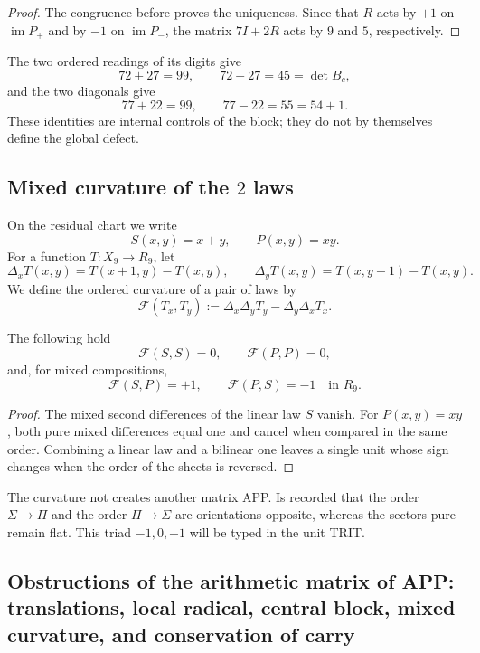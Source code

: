 \begin{proof}
The congruence before proves the uniqueness. Since that \(R\) acts by
\(+1\) on \(\operatorname{im}P_+\) and by \(-1\) on
\(\operatorname{im}P_-\), the matrix \(7I+2R\) acts by \(9\) and \(5\),
respectively.
\end{proof}

The two ordered readings of its digits give
\[
 72+27=99,
 \qquad
 72-27=45=\det B_c,
\]
and the two diagonals give
\[
 77+22=99,
 \qquad
 77-22=55=54+1.
\]
These identities are internal controls of the block; they do not by themselves define the global defect.

\subsection{Mixed curvature of the \(2\) laws}

On the residual chart we write
\[
 S(x,y)=x+y,
 \qquad
 P(x,y)=xy.
\]
For a function \(T:X_9\to R_9\), let
\[
 \Delta_xT(x,y)=T(x+1,y)-T(x,y),
 \qquad
 \Delta_yT(x,y)=T(x,y+1)-T(x,y).
\]
We define the ordered curvature of a pair of laws by
\[
 \mathcal F(T_x,T_y)
 :=\Delta_x\Delta_yT_y-\Delta_y\Delta_xT_x.
\]

\begin{proposition}
\label{p12-83-c1-s1:prop:app-curvatura-mixta}
The following hold
\[
 \mathcal F(S,S)=0,
 \qquad
 \mathcal F(P,P)=0,
\]
and, for mixed compositions,
\[
 \mathcal F(S,P)=+1,
 \qquad
 \mathcal F(P,S)=-1
 \quad\text{in }R_9.
\]
\end{proposition}

\begin{proof}
The mixed second differences of the linear law \(S\) vanish. For
\(P(x,y)=xy\), both pure mixed differences equal one and cancel when
compared in the same order. Combining a linear law and a bilinear one
leaves a single unit whose sign changes when the order of the sheets is reversed.
\end{proof}

The curvature not creates another matrix APP. Is recorded that the order
\(\Sigma\to\Pi\) and the order \(\Pi\to\Sigma\) are orientations opposite,
whereas the sectors pure remain flat. This triad
\(-1,0,+1\) will be typed in the unit TRIT.

\subsection{Obstructions of the arithmetic matrix of APP: translations, local radical, central block, mixed curvature, and conservation of carry}

